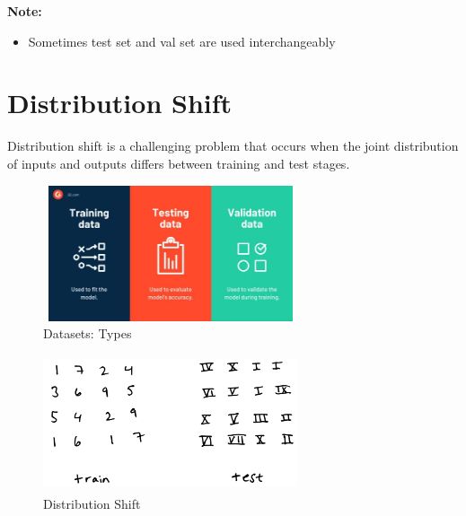 \vspace{0.2cm}


\textbf{Note:}
\begin{itemize}
    \item Sometimes test set and val set are used interchangeably
\end{itemize}

\section{Distribution Shift \cite{dnn-1,mit-imbalance-outliers-shift}}

Distribution shift is a challenging problem that occurs when the joint distribution of inputs and outputs differs between training and test stages.

\begin{table}[H]
    \begin{minipage}{0.45\textwidth}
        \begin{figure}[H]
            \centering
            \includegraphics[width=7.5cm,height=4cm]{Pictures/ml-data/ml-datasets-type.jpg}
            \caption{Datasets: Types}
        \end{figure}
    \end{minipage}
    \hfill
    \begin{minipage}{0.45\textwidth}
        \begin{figure}[H]
            \centering
            \includegraphics[width=7.5cm,height=4cm]{Pictures/ml-data/ml-data-distribution-shift.jpg}
            \caption{Distribution Shift}
        \end{figure}
    \end{minipage}
\end{table}

